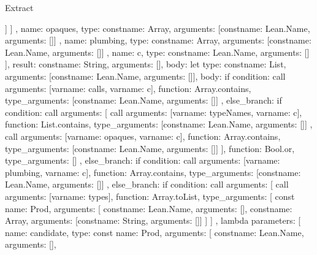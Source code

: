 \begin{lexlean}{Extract}
\begin{toolingmodule}
{{{{{                ]
              }
            ]
          }
        },
        {
          name: opaques,
          type: const{name: Array, arguments: [const{name: Lean.Name, arguments: []}]}
        },
        {
          name: plumbing,
          type: const{name: Array, arguments: [const{name: Lean.Name, arguments: []}]}
        },
        {name: c, type: const{name: Lean.Name, arguments: []}}
      ],
      result: const{name: String, arguments: []},
      body: let{
        type: const{name: List, arguments: [const{name: Lean.Name, arguments: []}]},
        body: if{
          condition: call{
            arguments: [var{name: calls}, var{name: c}],
            function: Array.contains,
            type_arguments: [const{name: Lean.Name, arguments: []}]
          },
          else_branch: if{
            condition: call{
              arguments: [
                call{
                  arguments: [var{name: typeNames}, var{name: c}],
                  function: List.contains,
                  type_arguments: [const{name: Lean.Name, arguments: []}]
                },
                call{
                  arguments: [var{name: opaques}, var{name: c}],
                  function: Array.contains,
                  type_arguments: [const{name: Lean.Name, arguments: []}]
                }
              ],
              function: Bool.or,
              type_arguments: []
            },
            else_branch: if{
              condition: call{
                arguments: [var{name: plumbing}, var{name: c}],
                function: Array.contains,
                type_arguments: [const{name: Lean.Name, arguments: []}]
              },
              else_branch: if{
                condition: call{
                  arguments: [
                    call{
                      arguments: [var{name: types}],
                      function: Array.toList,
                      type_arguments: [
                        const{
                          name: Prod,
                          arguments: [
                            const{name: Lean.Name, arguments: []},
                            const{name: Array, arguments: [const{name: String, arguments: []}]}
                          ]
                        }
                      ]
                    },
                    lambda{
                      parameters: [
                        {
                          name: candidate,
                          type: const{
                            name: Prod,
                            arguments: [
                              const{name: Lean.Name, arguments: []},
}}}}}}}}}}}
\end{toolingmodule}
\end{lexlean}
